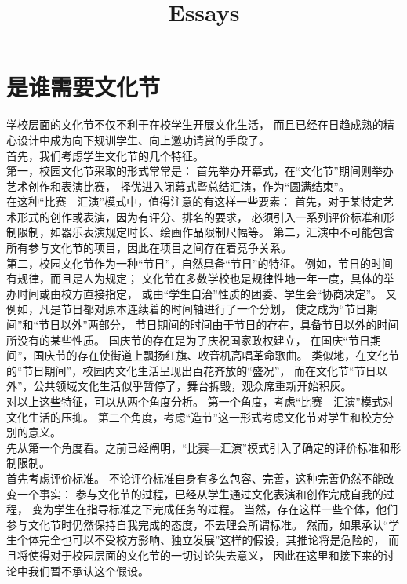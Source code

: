 \documentclass{article}
\begin{document}
\title{Essays}
\maketitle
\tableofcontents
\newpage


\section{是谁需要文化节}
    学校层面的文化节不仅不利于在校学生开展文化生活，
    而且已经在日趋成熟的精心设计中成为向下规训学生、向上邀功请赏的手段了。\\
    
    首先，我们考虑学生文化节的几个特征。\\
    
    第一，校园文化节采取的形式常常是：
    首先举办开幕式，在“文化节”期间则举办艺术创作和表演比赛，
    择优进入闭幕式暨总结汇演，作为“圆满结束”。\\
    
    在这种“比赛—汇演”模式中，值得注意的有这样一些要素：
    首先，对于某特定艺术形式的创作或表演，因为有评分、排名的要求，
    必须引入一系列评价标准和形制限制，如器乐表演规定时长、绘画作品限制尺幅等。
    第二，汇演中不可能包含所有参与文化节的项目，因此在项目之间存在着竞争关系。\\

    第二，校园文化节作为一种“节日”，自然具备“节日”的特征。
    例如，节日的时间有规律，而且是人为规定；
    文化节在多数学校也是规律性地一年一度，具体的举办时间或由校方直接指定，
    或由“学生自治”性质的团委、学生会“协商决定”。
    又例如，凡是节日都对原本连续着的时间轴进行了一个分划，
    使之成为“节日期间”和“节日以外”两部分，
    节日期间的时间由于节日的存在，具备节日以外的时间所没有的某些性质。
    国庆节的存在是为了庆祝国家政权建立，
    在国庆“节日期间”，国庆节的存在使街道上飘扬红旗、收音机高唱革命歌曲。
    类似地，在文化节的“节日期间”，校园内文化生活呈现出百花齐放的“盛况”，
    而在文化节“节日以外”，公共领域文化生活似乎暂停了，舞台拆毁，观众席重新开始积灰。\\

    对以上这些特征，可以从两个角度分析。
    第一个角度，考虑“比赛—汇演”模式对文化生活的压抑。
    第二个角度，考虑“造节”这一形式考虑文化节对学生和校方分别的意义。\\

    先从第一个角度看。之前已经阐明，“比赛—汇演”模式引入了确定的评价标准和形制限制。\\

    首先考虑评价标准。
    不论评价标准自身有多么包容、完善，这种完善仍然不能改变一个事实：
    参与文化节的过程，已经从学生通过文化表演和创作完成自我的过程，
    变为学生在指导标准之下完成任务的过程。
    当然，存在这样一些个体，他们参与文化节时仍然保持自我完成的态度，不去理会所谓标准。
    然而，如果承认“学生个体完全也可以不受校方影响、独立发展”这样的假设，其推论将是危险的，
    而且将使得对于校园层面的文化节的一切讨论失去意义，
    因此在这里和接下来的讨论中我们暂不承认这个假设。\\
\end{document}
